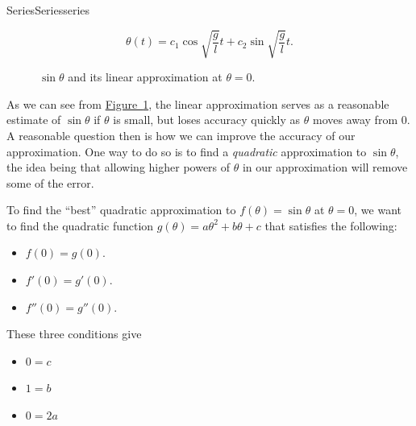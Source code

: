 \documentclass[oneside,10pt,]{book}
\numberwithin{equation}{section}
\begin{document}
\begin{chapterptx}{Series}{}{Series}{}{}{series}
\begin{introduction}{}
\begin{equation*}
\theta(t) = c_{1}\cos\sqrt{\frac{g}{l}}t + c_{2}\sin\sqrt{\frac{g}{l}}t.
\end{equation*}
%
\begin{figure}
\centering
{
}
\caption{\(\sin\theta\) and its linear approximation at \(\theta=0\).\label{figure-sine-linear-approximation}}
\end{figure}
\hypertarget{p-779}{}%
As we can see from \hyperref[figure-sine-linear-approximation]{Figure~\ref{figure-sine-linear-approximation}}, the linear approximation serves as a reasonable estimate of \(\sin\theta\) if \(\theta\) is small, but loses accuracy quickly as \(\theta\) moves away from \(0\). A reasonable question then is how we can improve the accuracy of our approximation. One way to do so is to find a \emph{quadratic} approximation to \(\sin\theta\), the idea being that allowing higher powers of \(\theta\) in our approximation will remove some of the error.%
\par
\hypertarget{p-780}{}%
To find the ``best'' quadratic approximation to \(f(\theta) = \sin\theta\) at \(\theta = 0\), we want to find the quadratic function \(g(\theta) = a\theta^{2} + b\theta + c\) that satisfies the following:%
\leavevmode%
\begin{itemize}[label=\textbullet]
\item{}\(f(0) = g(0).\)%
\item{}\(f'(0) = g'(0).\)%
\item{}\(f''(0) = g''(0).\)%
\end{itemize}
\hypertarget{p-781}{}%
These three conditions give%
\leavevmode%
\begin{itemize}[label=\textbullet]
\item{}\(0 = c\)%
\item{}\(1 = b\)%
\item{}\(0 = 2a\)%
\end{itemize}

\end{introduction}
\end{chapterptx}
\end{document}
